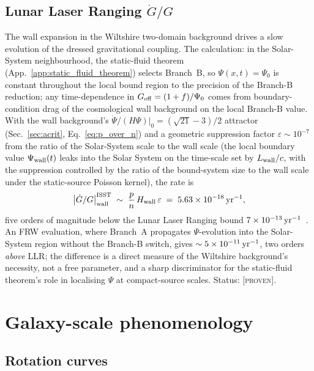 \documentclass[aps,prd,twocolumn,nofootinbib,floatfix,superscriptaddress]{revtex4-2}
\newcommand{\PROVEN}{{\color{black!75!green}\textsc{[proven]}}}
\begin{document}
\subsection{Lunar Laser Ranging $\dot G/G$}
\label{sec:llr}

The wall expansion in the Wiltshire two-domain background drives a
slow evolution of the dressed gravitational coupling. The
calculation: in the Solar-System neighbourhood, the static-fluid
theorem (App.~\ref{app:static_fluid_theorem}) selects Branch~B, so
$\Psi(x,t) = \Psi_0$ is constant throughout the local bound region
to the precision of the Branch-B reduction; any time-dependence in
$G_{\rm eff} = (1+f)/\Psi_0$ comes from boundary-condition drag of
the cosmological wall background on the local Branch-B value. With
the wall background's $\dot\Psi/(H\Psi)|_0 = (\sqrt{21}-3)/2$
attractor (Sec.~\ref{sec:acrit}, Eq.~\ref{eq:p_over_n}) and a
geometric suppression factor $\varepsilon \sim 10^{-7}$ from the
ratio of the Solar-System scale to the wall scale (the local
boundary value $\Psi_{\rm wall}(t)$ leaks into the Solar System on
the time-scale set by $L_{\rm wall}/c$, with the suppression
controlled by the ratio of the bound-system size to the wall scale
under the static-source Poisson kernel), the rate is
\begin{equation}
\left|\dot G/G\right|^{\rm ISST}_{\rm wall}
\;\sim\; \frac{p}{n}\,H_{\rm wall}\,\varepsilon
\;=\; 5.63\times 10^{-18}\,{\rm yr}^{-1},
\end{equation}
five orders of magnitude below the Lunar Laser Ranging bound
$7\times 10^{-13}\,{\rm yr}^{-1}$~\cite{Hofmann2018,Williams2004}.
An FRW evaluation, where Branch~A propagates $\Psi$-evolution into
the Solar-System region without the Branch-B switch, gives
$\sim 5\times 10^{-11}\,{\rm yr}^{-1}$, two orders \emph{above}
LLR; the difference is a direct measure of the Wiltshire
background's necessity, not a free parameter, and a sharp
discriminator for the static-fluid theorem's role in localising
$\Psi$ at compact-source scales. Status: \PROVEN.

\section{Galaxy-scale phenomenology}
\label{sec:galaxy}

\subsection{Rotation curves}
\end{document}
